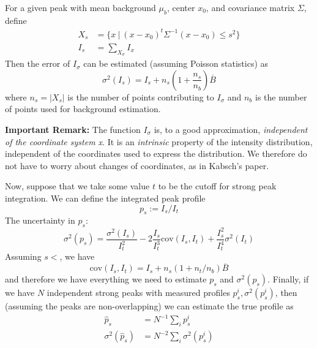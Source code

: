\documentclass[11pt,a4paper]{article}
\newcommand{\cov}{\mathrm{cov}}
\begin{document}
For a given peak with mean background $\mu_b$, center $x_0$, and covariance matrix $\Sigma$, define
\begin{align}
  X_s &= \{ x \ | \ (x-x_0)^t\Sigma^{-1}(x-x_0) \leq s^2\} \\
  I_s &= \sum_{X_\sigma} I_x
\end{align}
Then the error of $I_\sigma$ can be estimated (assuming Poisson statistics) as
\begin{equation}
  \sigma^2(I_s) = I_s + n_s(1+\frac{n_s}{n_b}) \overline{B}
\end{equation}
where $n_s = |X_s|$ is the number of points contributing to $I_\sigma$ and $n_b$ is the number of points used for background estimation.

\textbf{Important Remark:} The function $I_\sigma$ is, to a good approximation, \emph{independent of the coordinate system x}.
It is an \emph{intrinsic} property of the intensity distribution, independent of the coordinates used to express the distribution.
We therefore do not have to worry about changes of coordinates, as in Kabsch's paper.


Now, suppose that we take some value $t$ to be the cutoff for strong peak integration. We can define the integrated peak profile
\begin{equation}
  p_s := I_s / I_t
\end{equation}
The uncertainty in $p_s$:
\begin{equation}
  \sigma^2(p_s) = \frac{\sigma^2(I_s)}{I_t^2} - 2 \frac{I_s}{I_t^3} \cov(I_s, I_t) + \frac{I_s^2}{I_t^4} \sigma^2(I_t)
\end{equation}
Assuming $s < $, we have
\begin{equation}
  \cov(I_s, I_t) = I_s + n_s(1+n_t/n_b)\overline{B}
\end{equation}
and therefore we have everything we need to estimate $p_s$ and $\sigma^2(p_s)$. Finally, if we have $N$ independent strong
peaks with measured profiles $p^i_s, \sigma^2(p^i_s)$, then (assuming the peaks are non-overlapping) we can estimate the
true profile as
\begin{align}
  \hat{p}_s &= N^{-1} \sum_i p^i_s \\
 \sigma^2(\hat{p}_s) &= N^{-2} \sum_i \sigma^2(p^i_s)
\end{align}
\end{document}
